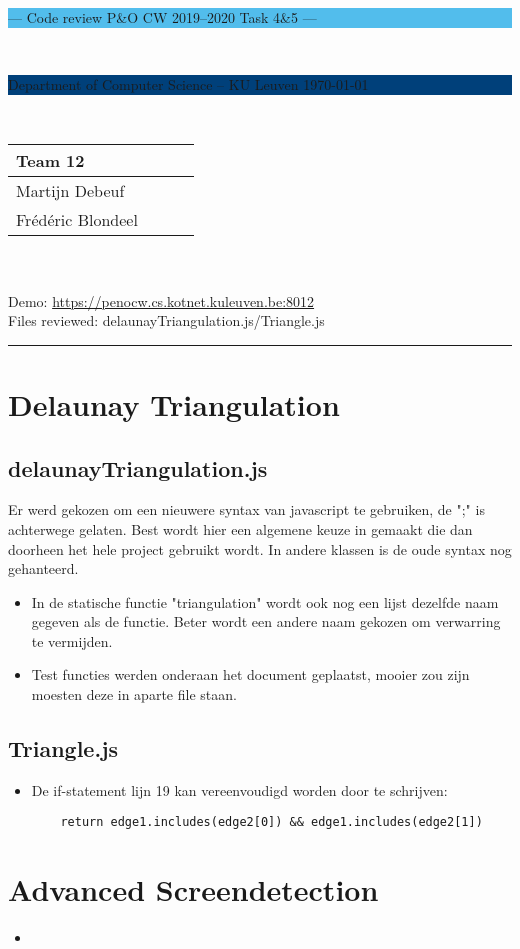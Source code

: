 \documentclass[a4paper,11pt]{article}
\begin{document}
\noindent
\colorbox[HTML]{52BDEC}{\bfseries\parbox{\textwidth}{\centering\large
  --- Code review P\&O CW 2019--2020 Task 4\&5 ---
}}
\\[-1mm]
\colorbox[HTML]{00407A}{\bfseries\color{white}\parbox{\textwidth}{
  Department of Computer Science -- KU Leuven
  \hfill
  \today
}}
\\

\smallskip

\noindent
\begin{tabular}{*4l}
\toprule
\multicolumn{3}{l}{\large\textbf{Team 12}} \\
\midrule
Martijn Debeuf &  &  \\ %
Frédéric Blondeel &  &  \\
\bottomrule
\hline
\end{tabular}\\
\\
Demo: \url{https://penocw.cs.kotnet.kuleuven.be:8012} \\
Files reviewed: delaunayTriangulation.js/Triangle.js

\noindent
{\color[HTML]{52BDEC} \rule{\linewidth}{1mm} }

\smallskip

\section{Delaunay Triangulation}
\subsection{delaunayTriangulation.js}
Er werd gekozen om een nieuwere syntax van javascript te gebruiken, de ";" is achterwege gelaten. 
Best wordt hier een algemene keuze in gemaakt die dan doorheen het hele project gebruikt wordt. In andere klassen 
is de oude syntax nog gehanteerd.
\begin{itemize}
\item In de statische functie "triangulation" wordt ook nog een lijst dezelfde naam gegeven als de functie. Beter wordt een andere naam gekozen om verwarring te vermijden.
\item Test functies werden onderaan het document geplaatst, mooier zou zijn moesten deze in aparte file staan.
\end{itemize}

\subsection{Triangle.js}
\begin{itemize}
	\item De if-statement lijn 19 kan vereenvoudigd worden door te schrijven:
	\begin{verbatim}
	return edge1.includes(edge2[0]) && edge1.includes(edge2[1])
	\end{verbatim}
\end{itemize}





\section{Advanced Screendetection}

\begin{itemize}
\item
\end{itemize}
\end{document}
